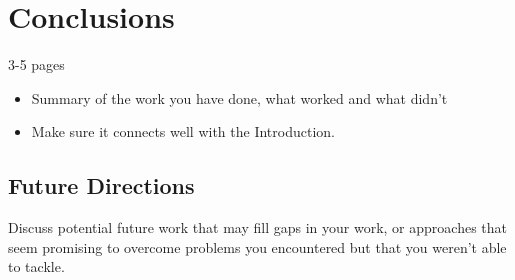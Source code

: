 \chapter{Conclusions}
\label{ch:conclusion}
3-5 pages
\begin{itemize}
    \item Summary of the work you have done, what worked and what didn't
    \item Make sure it connects well with the Introduction.
\end{itemize}

\section{Future Directions}
Discuss potential future work that may fill gaps in your work, or approaches that seem promising to overcome problems you encountered but that you weren't able to tackle.